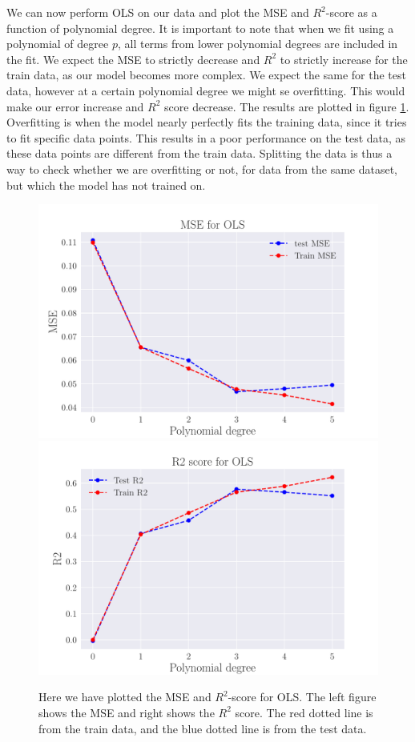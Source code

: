 \documentclass[reprint,english,notitlepage,aps,nobalancelastpage,nofootinbib]{revtex4-1}  %
\begin{document}
We can now perform OLS on our data and plot the MSE and $R^2$-score as a function of polynomial degree. It is important to note that when we fit using a polynomial of degree $p$, all terms from lower polynomial degrees are included in the fit. We expect the MSE to strictly decrease and $R^2$ to strictly increase for the train data, as our model becomes more complex. We expect the same for the test data, however at a certain polynomial degree we might se overfitting. This would make our error increase and $R^2$ score decrease. The results are plotted in figure \ref{fig:OLS_R2_and_MSE}. Overfitting is when the model nearly perfectly fits the training data, since it tries to fit specific data points. This results in a poor performance on the test data, as these data points are different from the train data. Splitting the data is thus a way to check whether we are overfitting or not, for data from the same dataset, but which the model has not trained on.

\begin{figure}[h]
	\includegraphics[width=\linewidth]{MSE_OLS_n30_eps02_pol5.pdf}
	\endminipage\hfill
	\includegraphics[width=\linewidth]{R2_OLS_n30_eps02_pol5.pdf}
	\endminipage
	\caption{Here we have plotted the MSE and $R^2$-score for OLS. The left figure shows the MSE and right shows the $R^2$ score. The red dotted line is from the train data, and the blue dotted line is from the test data.}\label{fig:OLS_R2_and_MSE}
\end{figure}
\end{document}
